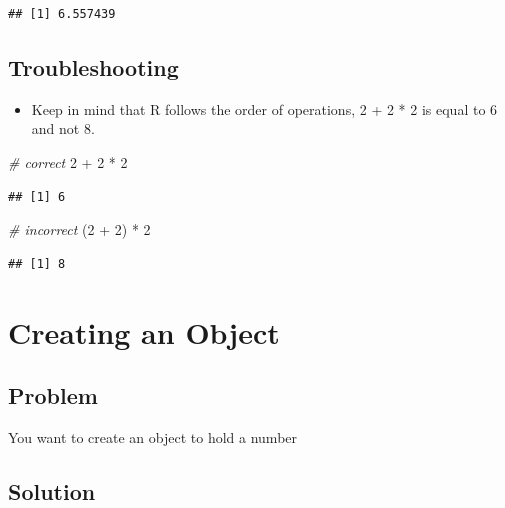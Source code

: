 \documentclass[
]{book}
\newenvironment{Shaded}{\begin{snugshade}}{\end{snugshade}}
\newcommand{\CommentTok}[1]{\textcolor[rgb]{0.56,0.35,0.01}{\textit{#1}}}
\newcommand{\DecValTok}[1]{\textcolor[rgb]{0.00,0.00,0.81}{#1}}
\newcommand{\NormalTok}[1]{#1}
\newcommand{\SpecialCharTok}[1]{\textcolor[rgb]{0.00,0.00,0.00}{#1}}
\providecommand{\tightlist}{%
  \setlength{\itemsep}{0pt}\setlength{\parskip}{0pt}}
\begin{document}
\begin{verbatim}
## [1] 6.557439
\end{verbatim}

\hypertarget{troubleshooting}{%
\subsection{Troubleshooting}\label{troubleshooting}}

\begin{itemize}
\tightlist
\item
  Keep in mind that R follows the order of operations, 2 + 2 * 2 is equal to 6 and not 8.
\end{itemize}

\begin{Shaded}
\begin{Highlighting}[]
\CommentTok{\# correct}
\DecValTok{2} \SpecialCharTok{+} \DecValTok{2} \SpecialCharTok{*} \DecValTok{2}
\end{Highlighting}
\end{Shaded}

\begin{verbatim}
## [1] 6
\end{verbatim}

\begin{Shaded}
\begin{Highlighting}[]
\CommentTok{\# incorrect}
\NormalTok{(}\DecValTok{2} \SpecialCharTok{+} \DecValTok{2}\NormalTok{) }\SpecialCharTok{*} \DecValTok{2}
\end{Highlighting}
\end{Shaded}

\begin{verbatim}
## [1] 8
\end{verbatim}

\hypertarget{object}{%
\section{Creating an Object}\label{object}}

\hypertarget{problem-1}{%
\subsection{Problem}\label{problem-1}}

You want to create an object to hold a number

\hypertarget{solution-1}{%
\subsection{Solution}\label{solution-1}}
\end{document}
